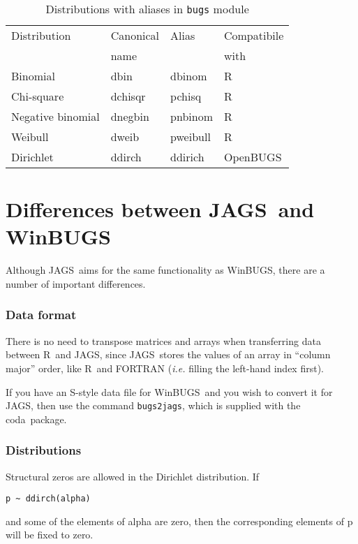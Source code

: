 \documentclass[11pt, a4paper, titlepage]{report}
\newcommand{\JAGS}{\textsf{JAGS}}
\newcommand{\WinBUGS}{\textsf{WinBUGS}}
\newcommand{\R}{\textsf{R}}
\newcommand{\CODA}{\textsf{coda}}
\begin{document}
\begin{table}
\begin{center}
\begin{tabular}{llll}
\hline
Distribution & Canonical & Alias & Compatibile  \\
             & name      &       & with         \\
\hline
Binomial           & dbin      & dbinom   & R   \\
Chi-square         & dchisqr   & pchisq   & R   \\ 
Negative binomial  & dnegbin   & pnbinom  & R   \\
Weibull            & dweib     & pweibull & R   \\ 
Dirichlet          & ddirch    & ddirich  & OpenBUGS \\
\hline
\end{tabular}
\caption{Distributions with aliases in \texttt{bugs} module
  \label{table:bugs:distributions:alias}}
\end{center}
\end{table}

\chapter{Differences between \JAGS\ and \WinBUGS}

Although \JAGS\ aims for the same functionality as \WinBUGS, there are
a number of important differences.

\subsection{Data format}

There is no need to transpose matrices and arrays when transferring
data between \R\ and \JAGS, since \JAGS\ stores the values of an array
in ``column major'' order, like \R\ and FORTRAN ({\em i.e.} filling
the left-hand index first).

If you have an \textsf{S}-style data file for \WinBUGS\ and you wish
to convert it for \JAGS, then use the command \texttt{bugs2jags},
which is supplied with the \CODA\ package.

\subsection{Distributions}

Structural zeros are allowed in the Dirichlet distribution. If
\begin{verbatim}
p ~ ddirch(alpha)
\end{verbatim}
and some of the elements of alpha are zero, then the corresponding
elements of p will be fixed to zero.
\end{document}
